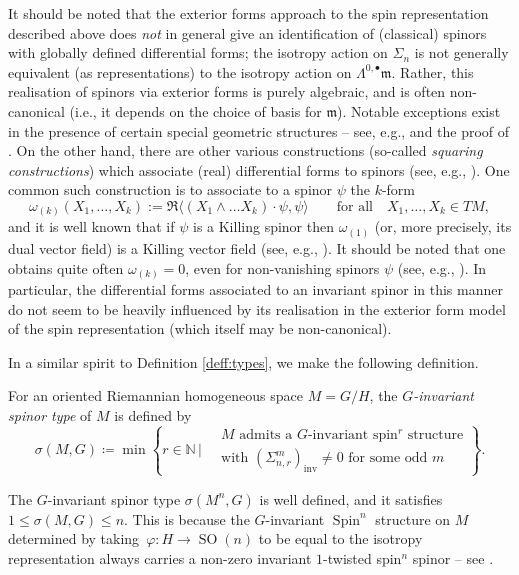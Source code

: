 \documentclass[pdftex]{sigma}
\numberwithin{equation}{section}
\DeclareMathOperator{\SO}{SO}
\DeclareMathOperator{\Spin}{Spin}
\begin{document}
		\begin{Remark}
			It should be noted that the exterior forms approach to the spin representation described above does \emph{not} in general give an identification of (classical) spinors with globally defined differential forms; the isotropy action on $\Sigma_n$ is not generally equivalent (as representations) to the isotropy action on $\Lambda^{0,\bullet}\mathfrak{m}$. Rather, this realisation of spinors via exterior forms is purely algebraic, and is often non-canonical (i.e., it depends on the choice of basis for $\mathfrak{m}$). Notable exceptions exist in the presence of certain special geometric structures -- see, e.g., \cite[Remark 3.9]{AHL} and the proof of \cite[Theorem 5.10]{jordansasakian}. On the other hand, there are other various constructions (so-called \emph{squaring constructions}) which associate (real) differential forms to spinors
			(see, e.g., \cite{CLS21,LM,Wang}). One common such construction is to associate to a spinor $\psi$ the $k$-form
			\[ \omega_{(k)}(X_1,\dots,X_k):= \Re \langle (X_1\wedge \dots X_k)\cdot \psi, \psi \rangle \qquad \text{for all}\quad X_1,\dots, X_k \in TM, \]
			and it is well known that if $\psi$ is a Killing spinor then $\omega_{(1)}$ (or, more precisely, its dual vector field) is a Killing vector field (see, e.g., \cite[Section 1.5]{BFGK}). It should be noted that one obtains quite often $\omega_{(k)}=0$, even for non-vanishing spinors $\psi$ (see, e.g., \cite[Table 6]{AHL}). In particular, the differential forms associated to an invariant spinor in this manner do not seem to be heavily influenced by its realisation in the exterior form model of the spin representation (which itself may be non-canonical).
		\end{Remark}
		
In a similar spirit to Definition \ref{deff:types}, we make the following definition.
		\begin{Definition}

			For an oriented Riemannian homogeneous space $M=G/H$, the \textit{$G$-invariant spinor type} of $M$ is defined by
			\[
			\sigma(M,G) \coloneqq \min\left\{ r \in \mathbb{N} \, \bigg\rvert \,
			\begin{aligned}
				&M \text{ admits a } G\text{-invariant spin}^r \text{ structure} \\
				&\text{with } (\Sigma_{n,r}^m)_{\mathrm{inv}} \neq 0 \text{ for some odd } m
			\end{aligned}
			\right\} .
			\]
		\end{Definition}
		\begin{Remark}
			The $G$-invariant spinor type $\sigma(M^n,G)$ is well defined, and it satisfies
			$
			1 \leq \sigma(M,G) \leq n$.
			This is because the $G$-invariant $\Spin^n$ structure on $M$ determined by taking~${\varphi \colon H \to \SO(n)}$ to be equal to the isotropy representation always carries a non-zero invariant $1$-twisted spin$^n$ spinor -- see \cite[Proposition 3.3]{EH16}.
		\end{Remark}
		
\end{document}
